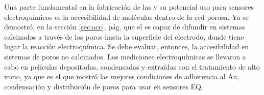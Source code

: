 	  Una parte fundamental en la fabricación de las \pdm\space y su potencial uso para sensores electroquímicos es la accesibilidad de moléculas dentro de la red porosa. Ya se demostró, en la sección \ref{sec:acc}, pág. \pageref{sec:acc} que el \aminorutenio\space es capaz de difundir en sistemas calcinados a través de los poros hasta la superficie del electrodo, donde tiene lugar la reacción electroquímica. Se debe evaluar, entonces,  la accesibilidad en sistemas de poros no calcinados. Los mediciones electroquímicas se llevaron a cabo en películas depositadas, condensadas y extraídas con el tratamiento de alto vacio, ya que es el que mostró las mejores condiciones de adherencia al Au, condensación y distribución de poros para usar en sensores EQ. 

